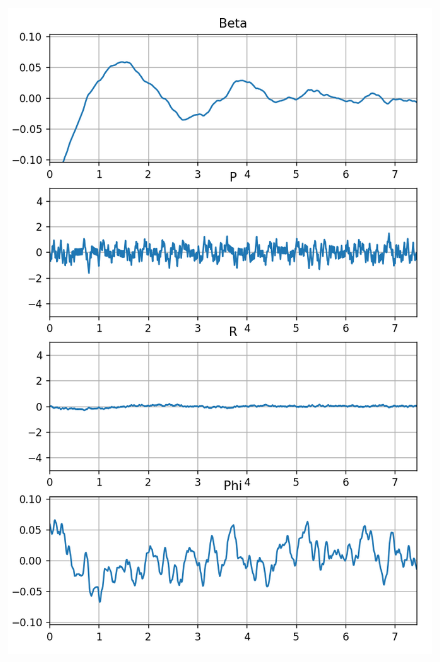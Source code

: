 \documentclass{beamer}
\begin{document}
\begin{frame}
\begin{multicols}{2}
            \begin{figure}
                \centering
                \includegraphics[scale=.28]{Figs/State.png}

            \end{figure}
        \end{multicols}
    \end{frame}
\end{document}
